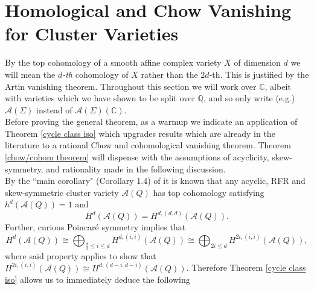 \documentclass[11pt]{amsart}
\theoremstyle{definition}
\theoremstyle{remark}
\numberwithin{equation}{section}
\begin{document}
\section{Homological and Chow Vanishing for Cluster Varieties}\label{section 5}


By the top cohomology of a smooth affine complex variety $X$ of dimension $d$ we will mean the \textit{$d$-th} cohomology of $X$ rather than the $2d$-th. This is justified by the Artin vanishing theorem. Throughout this section we will work over $\mathbb{C}$, albeit with varieties which we have shown to be split over $\mathbb{Q}$, and so only write (e.g.) $\mathcal{A}(\Sigma)$ instead of $\mathcal{A}(\Sigma)(\mathbb{C})$.\\

Before proving the general theorem, as a warmup we indicate an application of Theorem \ref{cycle class iso} which upgrades results which are already in the literature to a rational Chow and cohomological vanishing theorem. Theorem \ref{chow/cohom theorem} will dispense with the assumptions of acyclicity, skew-symmetry, and rationality made in the following discussion.\\

By the ``main corollary" (Corollary 1.4) of \cite{LSII} it is known that any acyclic, RFR and skew-symmetric cluster variety $\mathcal{A}(Q)$ has top cohomology satisfying $h^d(\mathcal{A}(Q)) = 1$ and \begin{equation}\label{LS cor}
    H^d(\mathcal{A}(Q)) = H^{d, (d, d)}(\mathcal{A}(Q)).
\end{equation} Further, curious Poincar\'e symmetry implies that \begin{equation}
    H^d(\mathcal{A}(Q)) \cong \bigoplus_{\frac{d}{2} \leq i \leq d} H^{d, (i, i)}(\mathcal{A}(Q)) \cong \bigoplus_{2i \leq d} H^{2i, (i, i)}(\mathcal{A}(Q)),
\end{equation} \noindent where said property applies to show that $H^{2i, (i, i)}(\mathcal{A}(Q)) \cong H^{d, (d - i, d - i)}(\mathcal{A}(Q))$. Therefore Theorem \ref{cycle class iso} allows us to immediately deduce the following
\end{document}
